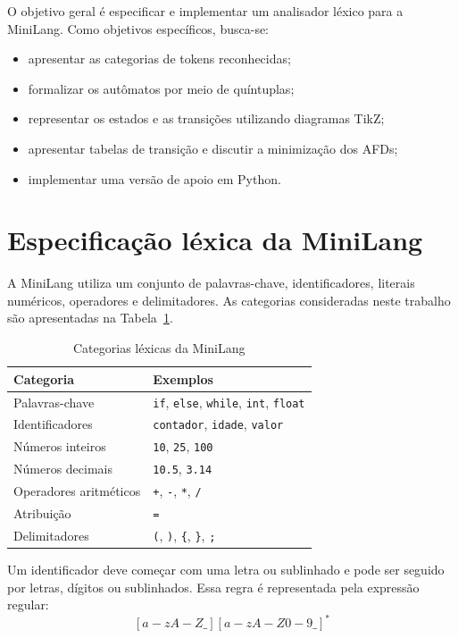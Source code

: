 \documentclass[12pt,a4paper]{article}
\begin{document}
O objetivo geral é especificar e implementar um analisador léxico para a
MiniLang. Como objetivos específicos, busca-se:
\begin{itemize}
    \item apresentar as categorias de tokens reconhecidas;
    \item formalizar os autômatos por meio de quíntuplas;
    \item representar os estados e as transições utilizando diagramas TikZ;
    \item apresentar tabelas de transição e discutir a minimização dos AFDs;
    \item implementar uma versão de apoio em Python.
\end{itemize}

\section{Especificação léxica da MiniLang}

A MiniLang utiliza um conjunto de palavras-chave, identificadores, literais
numéricos, operadores e delimitadores. As categorias consideradas neste
trabalho são apresentadas na Tabela~\ref{tab:tokens}.

\begin{table}[H]
\centering
\caption{Categorias léxicas da MiniLang}
\label{tab:tokens}
\begin{tabular}{p{3.4cm}p{9.0cm}}
\toprule
\textbf{Categoria} & \textbf{Exemplos} \\
\midrule
Palavras-chave & \texttt{if}, \texttt{else}, \texttt{while}, \texttt{int}, \texttt{float} \\
Identificadores & \texttt{contador}, \texttt{idade}, \texttt{valor} \\
Números inteiros & \texttt{10}, \texttt{25}, \texttt{100} \\
Números decimais & \texttt{10.5}, \texttt{3.14} \\
Operadores aritméticos & \texttt{+}, \texttt{-}, \texttt{*}, \texttt{/} \\
Atribuição & \texttt{=} \\
Delimitadores & \texttt{(}, \texttt{)}, \texttt{\{}, \texttt{\}}, \texttt{;} \\
\bottomrule
\end{tabular}
\end{table}

Um identificador deve começar com uma letra ou sublinhado e pode ser seguido
por letras, dígitos ou sublinhados. Essa regra é representada pela expressão
regular:
\[
    [a-zA-Z\_][a-zA-Z0-9\_]^*
\]
\end{document}
